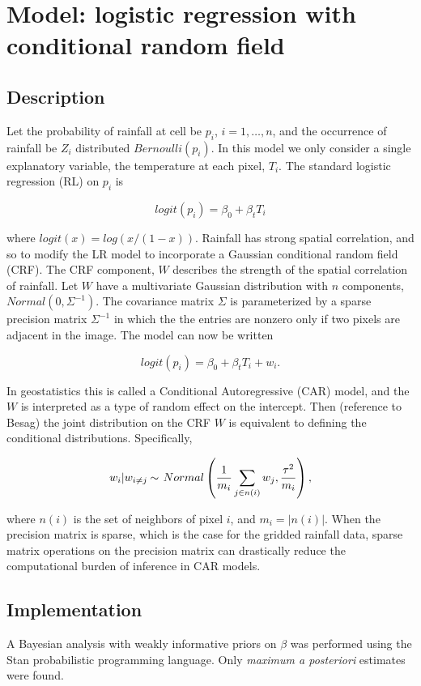 

\section{Model: logistic regression with conditional random field}

\subsection{Description}
Let the probability of rainfall at cell be $p_i$, $i=1,\ldots,n$, and the occurrence of rainfall be $Z_i$ distributed $Bernoulli(p_i)$. In this model we only consider a single explanatory variable, the temperature at each pixel, $T_i$. The standard logistic regression (RL) on $p_i$ is

$$
logit(p_i) = \beta_0 + \beta_t  T_i
$$

where $logit(x)=log(x/(1-x))$. Rainfall has strong spatial correlation, and so to modify the LR model to incorporate a Gaussian conditional random field (CRF). The CRF component, $W$ describes the strength of the spatial correlation of rainfall. Let $W$ have a multivariate Gaussian distribution with $n$ components, $Normal(0, \Sigma^{-1})$. The covariance matrix $\Sigma$ is parameterized by a sparse precision matrix $\Sigma^{-1}$ in which the the entries are nonzero only if two pixels are adjacent in the image. The model can now be written

$$
logit(p_i) = \beta_0 + \beta_t T_i + w_i.
$$

In geostatistics this is called a Conditional Autoregressive (CAR) model, and the $W$ is interpreted as a type of random effect on the intercept. Then (reference to Besag) the joint distribution on the CRF $W$ is equivalent to defining the conditional distributions. Specifically,

$$
w_i | w_{i \neq j} \distas{} \, Normal\left( \frac{1}{m_i} \sum_{j \in n(i)} w_j, \frac{\tau^2}{m_i} \right),
$$

where $n(i)$ is the set of neighbors of pixel $i$, and $m_i=|n(i)|$. When the precision matrix is sparse, which is the case for the gridded rainfall data, sparse matrix operations on the precision matrix can drastically reduce the computational burden of inference in CAR models.

\subsection{Implementation}
A Bayesian analysis with weakly informative priors on $\beta$ was performed using the Stan probabilistic programming language. Only \emph{maximum a posteriori} estimates were found.



